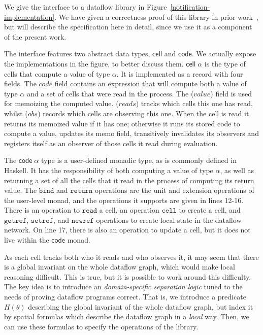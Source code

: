 \documentclass[nocopyrightspace,preprint]{sigplanconf}
\newcommand{\term}[1]{\ensuremath{\mathtt{{#1}}}}
\begin{document}
We give the interface to a dataflow library in
Figure~\ref{notification-implementation}. We have given a correctness
proof of this library in prior work~\cite{krishnaswamietal:ramified},
but will describe the specification here in detail, since we use it as
a component of the present work.

The interface features two abstract data types, $\mathsf{cell}$
and $\mathsf{code}$. We actually expose the implementations in the
figure, to better discuss them. $\mathsf{cell}\;\alpha$ is the type of
cells that compute a value of type $\alpha$. It is implemented as a
record with four fields.  The $\mathit{code}$ field contains an
expression that will compute both a value of type $\alpha$ and
a set of cells that were read in the process.  The ($\mathit{value}$)
field is used for memoizing the computed value.  ($\mathit{reads}$)
tracks which cells this one has read, whilst ($\mathit{obs}$) records
which cells are observing this one.  When the cell is read it returns its memoized value if it has one; otherwise it runs its stored code
to compute a value, updates its memo field, transitively
invalidates its observers and registers itself as an observer of those cells it
read during evaluation.

The $\mathsf{code}\;\alpha$ type
is a user-defined monadic type, as is commonly defined in Haskell. It
has the responsibility of both computing a value of type $\alpha$, as
well as returning a set of all the cells that it read in the process
of computing its return value. 
 The \term{bind} and \term{return}
operations are the unit and extension operations of the user-level
monad, and the operations it supports are given in lines 12-16. There
is an operation to \term{read} a cell, an operation \term{cell} to
create a cell, and \term{getref}, \term{setref}, and \term{newref}
operations to create local state in the dataflow network. On line 17,
there is also an operation to update a cell, but it does not live
within the $\mathsf{code}$ monad.

As each cell tracks both who it reads and who
observes it, it may seem that there is a global invariant on the whole
dataflow graph, which would make local reasoning difficult. This is
true, but it is possible to work around this difficulty. The key idea
is to introduce an \emph{domain-specific separation logic} tuned to
the needs of proving dataflow programs correct. That is, we introduce
a predicate $H(\theta)$ describing the global invariant of the whole
dataflow graph, but index it by spatial formulas which describe the
dataflow graph in a \emph{local} way. Then, we can use these formulas
to specify the operations of the library. 
\end{document}
